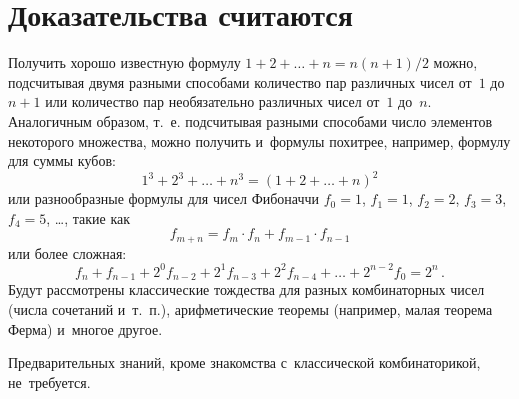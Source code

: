 
\section*{Доказательства считаются}



Получить хорошо известную формулу $1 + 2 + \ldots + n = n (n + 1) / 2$ можно,
подсчитывая двумя разными способами количество пар различных чисел от~$1$
до~$n + 1$ или количество пар необязательно различных чисел от~$1$ до~$n$.
Аналогичным образом, т.~е. подсчитывая разными способами число элементов
некоторого множества, можно получить и~формулы похитрее, например, формулу для
суммы кубов:
\[
    1^3 + 2^3 + \ldots + n^3
=
    (1 + 2 + \ldots + n)^2
\]
или разнообразные формулы для чисел Фибоначчи
$f_{0} = 1$, $f_{1} = 1$, $f_{2} = 2$, $f_{3} = 3$, $f_{4} = 5$, \ldots,
такие как
\[
    f_{m+n} = f_{m} \cdot f_{n} + f_{m-1} \cdot f_{n-1}
\]
или более сложная:
\[
    f_{n} + f_{n-1} +
    2^{0} f_{n-2} + 2^{1} f_{n-3} + 2^2 f_{n-4} +
    \ldots +
    2^{n-2} f_{0}
=
    2^n
\, . \]
Будут рассмотрены классические тождества для разных комбинаторных чисел
(числа сочетаний и~т.~п.), арифметические теоремы
(например, малая теорема Ферма) и~многое другое.

Предварительных знаний, кроме знакомства с~классической комбинаторикой,
не~требуется.


